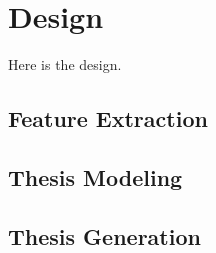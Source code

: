 \chapter{Design} \label{chapter:design}

Here is the design.

\section{Feature Extraction}

\section{Thesis Modeling}

\section{Thesis Generation}
